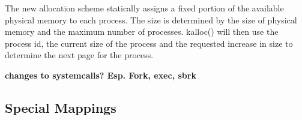 The new allocation scheme statically assigns a fixed portion of the available physical memory
to each process. The size is determined by the size of physical memory and the maximum number
of processes.
kalloc() will then use the process id, the current size of the process and the requested
increase in size to determine the next page for the process.

\textbf{changes to systemcalls? Esp. Fork, exec, sbrk}

\subsection{Special Mappings}









